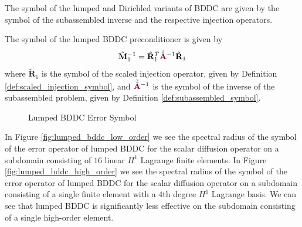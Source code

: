 The symbol of the lumped and Dirichled variants of BDDC are given by the symbol of the subassembled inverse and the respective injection operators.

\begin{definition}
The symbol of the lumped BDDC preconditioner is given by
\begin{equation}
\tilde{\mathbf{M}}^{-1}_1 = \tilde{\mathbf{R}}^T_1 \tilde{\hat{{\color{burgundy}\mathbf{A}}}}^{-1} \tilde{\mathbf{R}}_1
\end{equation}
where $\tilde{\mathbf{R}}_1$ is the symbol of the scaled injection operator, given by Definition \ref{def:scaled_injection_symbol}, and $\tilde{\hat{{\color{burgundy}\mathbf{A}}}}^{-1}$ is the symbol of the inverse of the subassembled problem, given by Definition \ref{def:subassembled_symbol}. 
\label{def:lumped_bddc_symbol}
\end{definition}

\begin{figure}[!ht]
  \centering
  \hfill
  \caption{Lumped BDDC Error Symbol}
\end{figure}

In Figure \ref{fig:lumped_bddc_low_order} we see the spectral radius of the symbol of the error operator of lumped BDDC for the scalar diffusion operator on a subdomain consisting of $16$ linear $H^1$ Lagrange finite elements.
In Figure \ref{fig:lumped_bddc_high_order} we see the spectral radius of the symbol of the error operator of lumped BDDC for the scalar diffusion operator on a subdomain consisting of a single finite element with a $4$th degree $H^1$ Lagrange basis.
We can see that lumped BDDC is significantly less effective on the subdomain consisting of a single high-order element.


